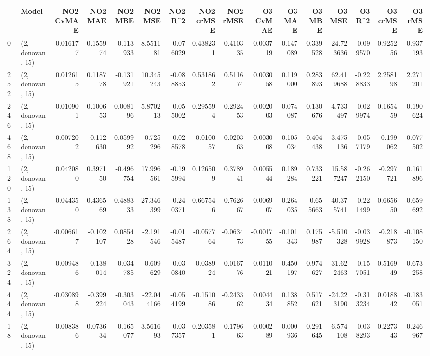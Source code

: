 \begin{tabular}{llrrrrrrrrrrrrrr}
\toprule
{} &             Model &  NO2 CvMAE &   NO2 MAE &   NO2 MBE &     NO2 MSE &   NO2 R\textasciicircum2 &  NO2 crMSE &  NO2 rMSE &  O3 CvMAE &    O3 MAE &    O3 MBE &      O3 MSE &    O3 R\textasciicircum2 &  O3 crMSE &   O3 rMSE \\
\midrule
0   &  (2, donovan, 15) &   0.016177 &  0.155974 & -0.113933 &    8.551181 & -0.076029 &   0.438231 &  0.410335 &  0.003719 &  0.147089 &  0.339528 &   24.723636 & -0.099570 &  0.925256 &  0.937193 \\
252 &  (2, donovan, 15) &   0.012615 &  0.118778 & -0.131921 &   10.345243 & -0.088853 &   0.531862 &  0.511674 &  0.003058 &  0.119000 &  0.283893 &   62.419688 & -0.228833 &  2.258198 &  2.271201 \\
246 &  (2, donovan, 15) &   0.010901 &  0.100653 &  0.008196 &    5.870213 & -0.055002 &   0.295594 &  0.292453 &  0.002003 &  0.074087 &  0.130676 &    4.733497 & -0.029974 &  0.165459 &  0.190624 \\
468 &  (2, donovan, 15) &  -0.007202 & -0.112630 &  0.059992 &   -0.725296 & -0.028578 &  -0.010057 & -0.020363 &  0.003008 &  0.105034 &  0.404438 &    3.475136 & -0.057179 & -0.199062 &  0.077502 \\
120 &  (2, donovan, 15) &   0.042080 &  0.397150 & -0.496754 &   17.996561 & -0.195994 &   0.126509 &  0.378941 &  0.005544 &  0.189284 &  0.733221 &   15.587247 & -0.262150 & -0.297721 &  0.161896 \\
138 &  (2, donovan, 15) &   0.044350 &  0.436569 &  0.488333 &   27.346399 & -0.240371 &   0.667546 &  0.762667 &  0.006907 &  0.264035 & -0.655663 &   40.375741 & -0.221499 &  0.665650 &  0.659692 \\
264 &  (2, donovan, 15) &  -0.006617 & -0.102107 &  0.085428 &   -2.191546 & -0.015487 &  -0.057764 & -0.063473 & -0.001755 & -0.101343 &  0.175987 &   -5.510328 & -0.039928 & -0.218873 & -0.108150 \\
324 &  (2, donovan, 15) &  -0.009486 & -0.138014 & -0.034785 &   -0.609629 & -0.030840 &  -0.038924 & -0.016776 &  0.011021 &  0.450197 &  0.974627 &   31.622463 & -0.157051 &  0.516949 &  0.673258 \\
444 &  (2, donovan, 15) &  -0.030898 & -0.399224 & -0.303043 &  -22.044166 & -0.054199 &  -0.151086 & -0.243362 &  0.004434 &  0.138852 &  0.517621 &  -24.223190 & -0.313234 &  0.018842 & -0.183051 \\
18  &  (2, donovan, 15) &   0.008386 &  0.073634 & -0.165077 &    3.561693 & -0.037357 &   0.203581 &  0.179663 &  0.000289 & -0.000936 &  0.291645 &    6.574108 & -0.038293 &  0.227343 &  0.246967 \\

\end{tabular}
